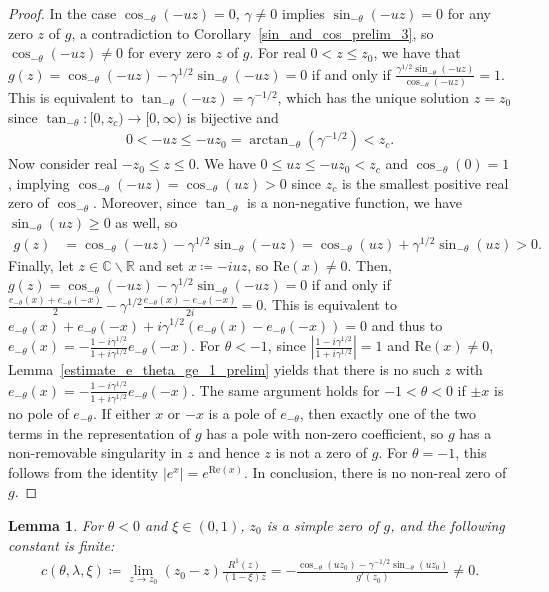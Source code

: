\documentclass[10pt,a4paper]{amsart}
\newcommand{\R}{\mathbb{R}} %
\newcommand{\C}{\mathbb{C}} %
\newcommand{\1}{\mathds{1}}
\renewcommand{\Re}{\mathrm{Re}}
\newtheorem{Lemma}[definition]{Lemma}
\begin{document}
\begin{proof}
 In the case $\cos_{-\theta}(-uz)=0$, $\gamma\neq 0$ implies $\sin_{-\theta}(-uz)=0$ for any zero $z$ of $g$, a contradiction to Corollary~\ref{sin_and_cos_prelim_3}, so $\cos_{-\theta}(-uz)\neq 0$ for every zero $z$ of $g$. For real $0<z\le z_0$, we have that $ g(z)= \cos_{-\theta}(-uz)-\gamma^{1/2}\sin_{-\theta}(-uz)=0$ if and only if $\frac{\gamma^{1/2}\sin_{-\theta}(-uz)}{\cos_{-\theta}(-uz)}=1$. This is equivalent to $\tan_{-\theta}(-uz)=\gamma^{-1/2}$, which has the unique solution $z=z_0$ since $\tan_{-\theta}:[0,z_c)\to[0,\infty)$ is bijective and 
\begin{align*}
    0<-uz\le -uz_0=\arctan_{-\theta}(\gamma^{-1/2})<z_c.
\end{align*}
Now consider real $-z_0\leq z\leq 0$. We have $0\le uz\le-u{z_0}<z_c$ and $\cos_{-\theta}(0)=1$, implying $\cos_{-\theta}(-u{z})=\cos_{-\theta}(u{z})> 0$ since $z_c$ is the smallest positive real zero of $\cos_{-\theta}$. Moreover, since $\tan_{-\theta}$ is a non-negative function, we have $\sin_{-\theta}(uz)\ge0$ as well, so
\begin{align*}
    g(z)&=\cos_{-\theta}(-uz)-\gamma^{1/2}\sin_{-\theta}(-uz)
        =\cos_{-\theta}(uz)+\gamma^{1/2}\sin_{-\theta}(uz)>0.
\end{align*}
Finally, let $z\in\C\backslash \R$ and set $x\coloneqq -iuz$, so $\Re(x)\ne 0$. Then, $g(z)= \cos_{-\theta}(-uz)-\gamma^{1/2}\sin_{-\theta}(-uz)=0$ if and only if $ \frac{e_{-\theta}(x)+e_{-\theta}(-x)}{2}-\gamma^{1/2}\frac{e_{-\theta}(x)-e_{-\theta}(-x)}{2i}=0$. This is equivalent to $ e_{-\theta}(x)+e_{-\theta}(-x)+i\gamma^{1/2}(e_{-\theta}(x)-e_{-\theta}(-x))=0$ and thus to $e_{-\theta}(x)=-\frac{1-i\gamma^{1/2}}{1+i\gamma^{1/2}}e_{-\theta}(-x)$.
For $\theta<-1$, since $\left|\frac{1-i\gamma^{1/2}}{1+i\gamma^{1/2}}\right|=1$ and $\Re(x)\ne 0$, Lemma~\ref{estimate_e_theta_ge_1_prelim} yields that there is no such $z$ with  $e_{-\theta}(x)=-\frac{1-i\gamma^{1/2}}{1+i\gamma^{1/2}}e_{-\theta}(-x)$. The same argument holds for $-1<\theta<0$ if $\pm x$ is no pole of $e_{-\theta}$. If either $x$ or $-x$ is a pole of $e_{-\theta}$, then exactly one of the two terms in the representation of $g$ has a pole with non-zero coefficient, so $g$ has a non-removable singularity in $z$ and hence $z$ is not a zero of $g$. For $\theta=-1$, this follows from the identity $|e^x|=e^{\Re(x)}$. In conclusion, there is no non-real zero of $g$.
\end{proof}
\begin{Lemma}\label{z_0_simple}
   For $\theta<0$ and $\xi\in(0,1)$, $z_0$ is a simple zero of $g$, and the following constant is finite:
   \begin{align}\label{c_non_zero_negtheta}
       c(\theta,\lambda,\xi)\coloneqq \lim_{z\to z_0}\left(z_0-z\right)\frac{R^1(z)}{(1-\xi) z}=-\frac{\cos_{-\theta}(uz_0)-\gamma^{-1/2}\sin_{-\theta}(uz_0)}{g'(z_0)}\neq 0.
  \end{align}
\end{Lemma}
\end{document}
